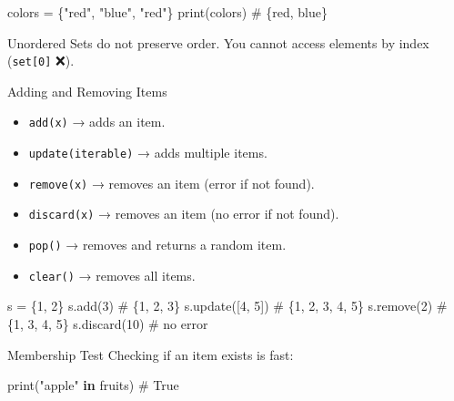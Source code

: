 \documentclass[
  letterpaper,
  DIV=11,
  numbers=noendperiod]{scrreprt}
\newenvironment{Shaded}{\begin{snugshade}}{\end{snugshade}}
\newcommand{\BuiltInTok}[1]{\textcolor[rgb]{0.00,0.23,0.31}{#1}}
\newcommand{\CommentTok}[1]{\textcolor[rgb]{0.37,0.37,0.37}{#1}}
\newcommand{\DecValTok}[1]{\textcolor[rgb]{0.68,0.00,0.00}{#1}}
\newcommand{\KeywordTok}[1]{\textcolor[rgb]{0.00,0.23,0.31}{\textbf{#1}}}
\newcommand{\NormalTok}[1]{\textcolor[rgb]{0.00,0.23,0.31}{#1}}
\newcommand{\OperatorTok}[1]{\textcolor[rgb]{0.37,0.37,0.37}{#1}}
\newcommand{\StringTok}[1]{\textcolor[rgb]{0.13,0.47,0.30}{#1}}
\providecommand{\tightlist}{%
  \setlength{\itemsep}{0pt}\setlength{\parskip}{0pt}}
\begin{document}
\begin{Shaded}
\begin{Highlighting}[]
\NormalTok{colors }\OperatorTok{=}\NormalTok{ \{}\StringTok{"red"}\NormalTok{, }\StringTok{"blue"}\NormalTok{, }\StringTok{"red"}\NormalTok{\}}
\BuiltInTok{print}\NormalTok{(colors)  }\CommentTok{\# \{\textquotesingle{}red\textquotesingle{}, \textquotesingle{}blue\textquotesingle{}\}}
\end{Highlighting}
\end{Shaded}

Unordered Sets do not preserve order. You cannot access elements by
index (\texttt{set{[}0{]}} ❌).

Adding and Removing Items

\begin{itemize}
\tightlist
\item
  \texttt{add(x)} → adds an item.
\item
  \texttt{update(iterable)} → adds multiple items.
\item
  \texttt{remove(x)} → removes an item (error if not found).
\item
  \texttt{discard(x)} → removes an item (no error if not found).
\item
  \texttt{pop()} → removes and returns a random item.
\item
  \texttt{clear()} → removes all items.
\end{itemize}

\begin{Shaded}
\begin{Highlighting}[]
\NormalTok{s }\OperatorTok{=}\NormalTok{ \{}\DecValTok{1}\NormalTok{, }\DecValTok{2}\NormalTok{\}}
\NormalTok{s.add(}\DecValTok{3}\NormalTok{)           }\CommentTok{\# \{1, 2, 3\}}
\NormalTok{s.update([}\DecValTok{4}\NormalTok{, }\DecValTok{5}\NormalTok{])   }\CommentTok{\# \{1, 2, 3, 4, 5\}}
\NormalTok{s.remove(}\DecValTok{2}\NormalTok{)        }\CommentTok{\# \{1, 3, 4, 5\}}
\NormalTok{s.discard(}\DecValTok{10}\NormalTok{)      }\CommentTok{\# no error}
\end{Highlighting}
\end{Shaded}

Membership Test Checking if an item exists is fast:

\begin{Shaded}
\begin{Highlighting}[]
\BuiltInTok{print}\NormalTok{(}\StringTok{"apple"} \KeywordTok{in}\NormalTok{ fruits)  }\CommentTok{\# True}
\end{Highlighting}
\end{Shaded}
\end{document}
